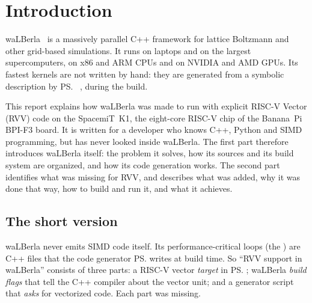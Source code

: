 \chapter{Introduction}\label{r02:ch:introduction}

waLBerla~\cite{walberla} is a massively parallel C++ framework for lattice Boltzmann
and other grid-based simulations. It runs on laptops and on the largest
supercomputers, on x86 and ARM CPUs and on NVIDIA and AMD GPUs. Its fastest kernels
are not written by hand: they are generated from a symbolic description by
\ps{}~\cite{pystencils}, during the build.

This report explains how waLBerla was made to run with explicit RISC-V Vector (RVV)
code on the SpacemiT~K1, the eight-core RISC-V chip of the Banana~Pi BPI-F3 board.
It is written for a developer who knows C++, Python and SIMD programming, but has
never looked inside waLBerla. The first part therefore introduces waLBerla itself: the
problem it solves, how its sources and its build system are organized, and how its
code generation works. The second part identifies what was missing for RVV, and
describes what was added, why it was done that way, how to build and run it, and what
it achieves.

\section{The short version}

\begin{keyidea}
  waLBerla never emits SIMD code itself. Its performance-critical loops (the
  ) are C++ files that the code generator \ps{} writes at build time.
  So ``RVV support in waLBerla'' consists of three parts: a RISC-V vector
  \emph{target} in \ps{}; waLBerla \emph{build flags} that tell the C++ compiler
  about the vector unit; and a generator script that \emph{asks} for vectorized
  code. Each part was missing.
\end{keyidea}

